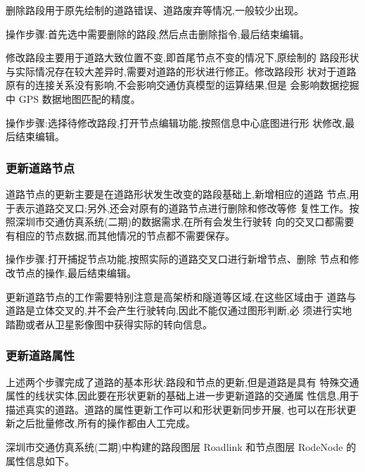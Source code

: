 删除路段用于原先绘制的道路错误、道路废弃等情况,一般较少出现。

操作步骤:首先选中需要删除的路段,然后点击删除指令,最后结束编辑。

修改路段主要用于道路大致位置不变,即首尾节点不变的情况下,原绘制的
路段形状与实际情况存在较大差异时,需要对道路的形状进行修正。修改路段形
状对于道路原有的连接关系没有影响,不会影响交通仿真模型的运算结果,但是
会影响数据挖掘中 GPS 数据地图匹配的精度。

操作步骤:选择待修改路段,打开节点编辑功能,按照信息中心底图进行形
状修改,最后结束编辑。

\subsubsection{更新道路节点}
道路节点的更新主要是在道路形状发生改变的路段基础上,新增相应的道路
节点,用于表示道路交叉口;另外,还会对原有的道路节点进行删除和修改等修
复性工作。按照深圳市交通仿真系统(二期)的数据需求,在所有会发生行驶转
向的交叉口都需要有相应的节点数据,而其他情况的节点都不需要保存。

操作步骤:打开捕捉节点功能,按照实际的道路交叉口进行新增节点、删除
节点和修改节点的操作,最后结束编辑。

更新道路节点的工作需要特别注意是高架桥和隧道等区域,在这些区域由于
道路与道路是立体交叉的,并不会产生行驶转向,因此不能仅通过图形判断,必
须进行实地踏勘或者从卫星影像图中获得实际的转向信息。

\subsubsection{更新道路属性}
上述两个步骤完成了道路的基本形状:路段和节点的更新,但是道路是具有
特殊交通属性的线状实体,因此要在形状更新的基础上进一步更新道路的交通属
性信息,用于描述真实的道路。道路的属性更新工作可以和形状更新同步开展,
也可以在形状更新之后批量修改,所有的操作都由人工完成。

深圳市交通仿真系统(二期)中构建的路段图层 Roadlink 和节点图层
RodeNode 的属性信息如下。

